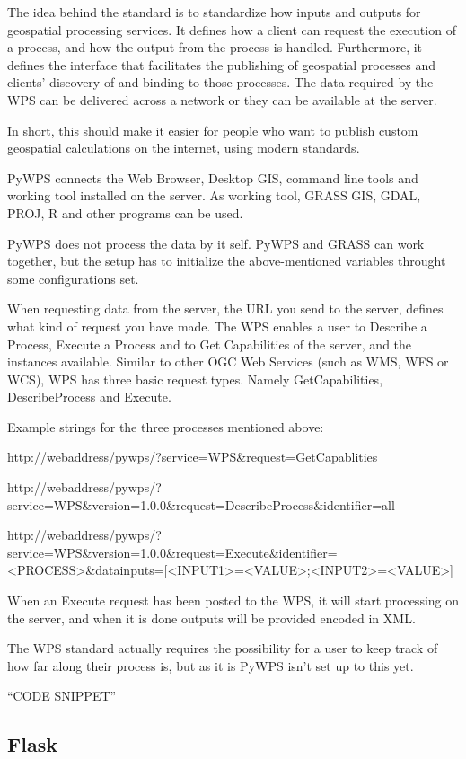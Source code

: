 The idea behind the standard is to standardize how inputs and outputs for geospatial processing services. It defines how a client can request the execution of a process, and how the output from the process is handled. Furthermore, it defines the interface that facilitates the publishing of geospatial processes and clients’ discovery of and binding to those processes. The data required by the WPS can be delivered across a network or they can be available at the server.

In short, this should make it easier for people who want to publish custom geospatial calculations on the internet, using modern standards. 

PyWPS connects the Web Browser, Desktop GIS, command line tools and working tool installed on the server. As working tool, GRASS GIS, GDAL, PROJ, R and other programs can be used.

PyWPS does not process the data by it self.  PyWPS and GRASS can work together, but the setup has to initialize the above-mentioned variables throught some configurations set. 

When requesting data from the server, the URL you send to the server, defines what kind of request you have made. 
The WPS enables a user to Describe a Process, Execute a Process and to Get Capabilities of the server, and the instances available. Similar to other OGC Web Services (such as WMS, WFS or WCS), WPS has three basic request types. Namely GetCapabilities, DescribeProcess and Execute.

Example strings for the three processes mentioned above:

http://webaddress/pywps/?service=WPS\&request=GetCapablities 

http://webaddress/pywps/?service=WPS\&version=1.0.0\&request=DescribeProcess\&identifier=all

http://webaddress/pywps/?service=WPS\&version=1.0.0\&request=Execute\&identifier=<PROCESS>\&datainputs=[<INPUT1>=<VALUE>;<INPUT2>=<VALUE>]

When an Execute request has been posted to the WPS, it will start processing on the server, and when it is done outputs will be provided encoded in XML. 

The WPS standard actually requires the possibility for a user to keep track of how far along their process is, but as it is PyWPS isn't set up to this yet. 

“CODE SNIPPET”


\subsection*{Flask}

